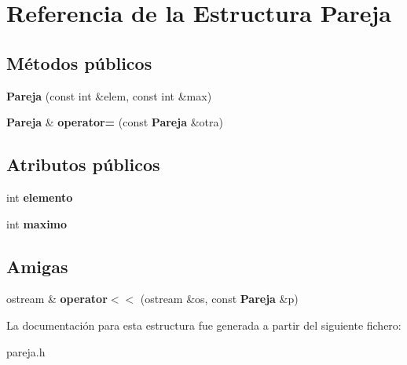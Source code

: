 \section{Referencia de la Estructura Pareja}
\label{structPareja}
\subsection*{Métodos públicos}
\begin{DoxyCompactItemize}
\item 
\mbox{\label{structPareja_a5ac526ff73a4232293cc9c04be4fecc7}} 
{\bfseries Pareja} (const int \&elem, const int \&max)
\item 
\mbox{\label{structPareja_aa6938ace7b6953a72c892a892c89abe6}} 
\textbf{ Pareja} \& {\bfseries operator=} (const \textbf{ Pareja} \&otra)
\end{DoxyCompactItemize}
\subsection*{Atributos públicos}
\begin{DoxyCompactItemize}
\item 
\mbox{\label{structPareja_a2b2078c7a1f388c44e9a271339816960}} 
int {\bfseries elemento}
\item 
\mbox{\label{structPareja_ac5a1af10db807f8ba0f1fa1ba04b8a2c}} 
int {\bfseries maximo}
\end{DoxyCompactItemize}
\subsection*{Amigas}
\begin{DoxyCompactItemize}
\item 
\mbox{\label{structPareja_af67c929edd2d143f9523fc10cba0102e}} 
ostream \& {\bfseries operator$<$$<$} (ostream \&os, const \textbf{ Pareja} \&p)
\end{DoxyCompactItemize}


La documentación para esta estructura fue generada a partir del siguiente fichero\+:\begin{DoxyCompactItemize}
\item 
pareja.\+h\end{DoxyCompactItemize}
